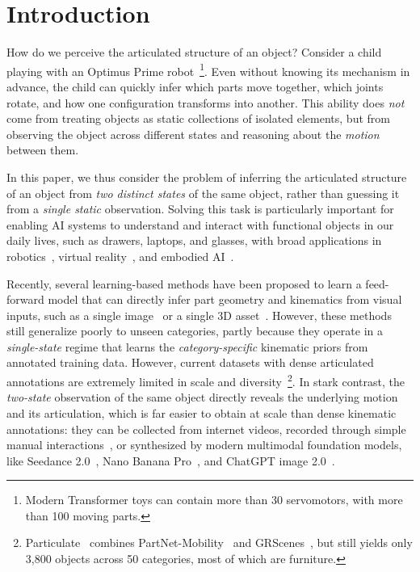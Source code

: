 \section{Introduction}%
\label{sec:intro}

How do we perceive the articulated structure of an object?
Consider a child playing with an Optimus Prime robot~\footnote{Modern Transformer toys can contain more than 30 servomotors, with more than 100 moving parts.}.
Even without knowing its mechanism in advance, the child can quickly infer which parts move together, which joints rotate, and how one configuration transforms into another.
This ability does \emph{not} come from treating objects as static collections of isolated elements, but from observing the object across different states and reasoning about the \emph{motion} between them.

In this paper, we thus consider the problem of inferring the articulated structure of an object from \emph{two distinct states} of the same object,
rather than guessing it from a \emph{single static} observation.
Solving this task is particularly important for enabling AI systems to understand and interact with functional objects in our daily lives, such as drawers, laptops, and glasses, with broad applications in robotics~\cite{xiang2020sapien,li2024behavior}, virtual reality~\cite{chen2025freeart3d}, and embodied AI~\cite{Puig2023habitat,liigibson}.

Recently, several learning-based methods have been proposed to learn a feed-forward model that can directly infer part geometry and kinematics from visual inputs, such as a single image~\cite{chen2024urdformer,chen2025ArtiLatent} or a single 3D asset~\cite{che2024op,Goyal_2025_ICCV,li2025particulate}.
However, these methods still generalize poorly to unseen categories,
partly because they operate in a \emph{single-state} regime that learns the \emph{category-specific} kinematic priors from annotated training data.
However, current datasets with dense articulated annotations are extremely limited in scale and diversity~\footnote{Particulate~\cite{li2025particulate} combines PartNet-Mobility~\cite{Mo_2019_CVPR} and GRScenes~\cite{wang2024grutopia},
but still yields only 3,800 objects across 50 categories, most of which are furniture.}.
In stark contrast, the \emph{two-state} observation of the same object directly reveals the underlying motion and its articulation,
which is far easier to obtain at scale than dense kinematic annotations:
they can be collected from internet videos,
recorded through simple manual interactions~\cite{huang2026react3d},
or synthesized by modern multimodal foundation models,
like Seedance 2.0~\cite{seedance2026seedance}, Nano Banana Pro~\cite{gemini_image_pro}, and ChatGPT image 2.0~\cite{chatgpt_images_2_0}.

